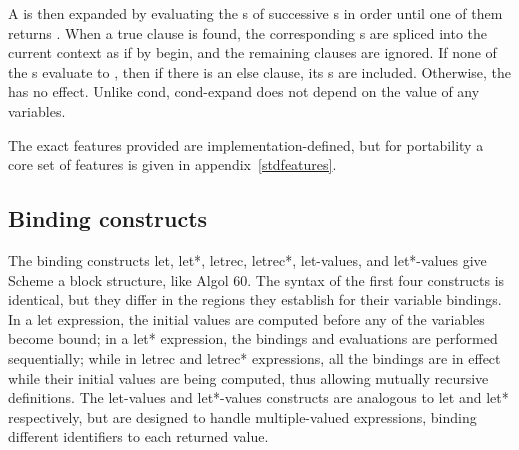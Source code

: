\begin{entry}{%
}
A  is then expanded by evaluating the
s of successive s
in order until one of them returns \schtrue.  When a true clause is
found, the corresponding s are spliced into
the current context as if by {\cf begin}, and the remaining clauses are ignored.
If none of the s evaluate to \schtrue, then
if there is an else clause, its s are
included.  Otherwise, the  has no effect.
Unlike {\cf cond}, {\cf cond-expand} does not depend on the value
of any variables.

The exact features provided are implementation-defined, but for
portability a core set of features is given in
appendix~\ref{stdfeatures}.

\end{entry}

\subsection{Binding constructs}
\label{bindingsection}

The binding constructs {\cf let}, {\cf let*}, {\cf letrec}, {\cf letrec*},
{\cf let-values}, and {\cf let*-values}
give Scheme a block structure, like Algol 60.  The syntax of the first four
constructs is identical, but they differ in the regions they establish
for their variable bindings.  In a {\cf let} expression, the initial
values are computed before any of the variables become bound; in a
{\cf let*} expression, the bindings and evaluations are performed
sequentially; while in {\cf letrec} and {\cf letrec*} expressions,
all the bindings are in
effect while their initial values are being computed, thus allowing
mutually recursive definitions.
The {\cf let-values} and {\cf let*-values} constructs are analogous to {\cf let} and {\cf let*}
respectively, but are designed to handle multiple-valued expressions, binding
different identifiers to each returned value.

